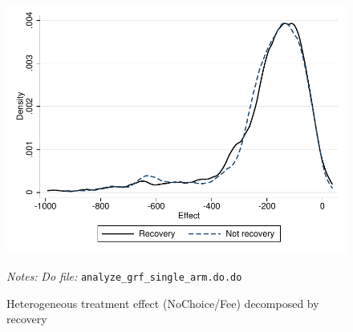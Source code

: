 \documentclass[11pt]{article}
\begin{document}
\begin{figure}[H]
        \caption{Heterogeneous treatment effect (NoChoice/Fee) decomposed by recovery}
    \label{hte_dec_rec}
    \begin{center}
        \centering
        \includegraphics[width=\textwidth]{Figuras/he_dist_dec_fc_admin_disc_pro_2.pdf}
    \end{center}
     \footnotesize \textit{Notes: } 
        \footnotesize{ } \textit{Do file: }  \texttt{analyze\_grf\_single\_arm.do.do}
\end{figure}
\end{document}
